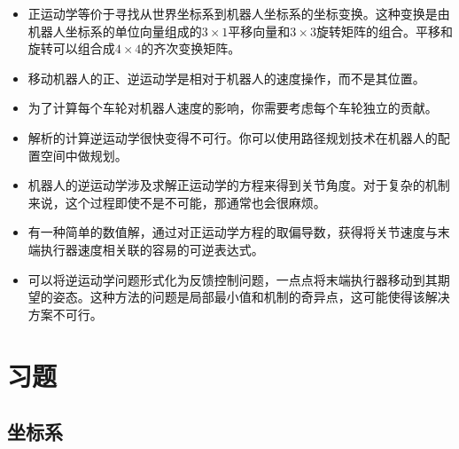 \begin{itemize}
\item 正运动学等价于寻找从世界坐标系到机器人坐标系的坐标变换。这种变换是由机器人坐标系的单位向量组成的$3\times 1$平移向量和$3\times 3$旋转矩阵的组合。平移和旋转可以组合成$4\times 4$的齐次变换矩阵。
\item 移动机器人的正、逆运动学是相对于机器人的速度操作，而不是其位置。
\item 为了计算每个车轮对机器人速度的影响，你需要考虑每个车轮独立的贡献。
\item 解析的计算逆运动学很快变得不可行。你可以使用路径规划技术在机器人的配置空间中做规划。
\item 机器人的逆运动学涉及求解正运动学的方程来得到关节角度。对于复杂的机制来说，这个过程即使不是不可能，那通常也会很麻烦。
\item 有一种简单的数值解，通过对正运动学方程的取偏导数，获得将关节速度与末端执行器速度相关联的容易的可逆表达式。
\item 可以将逆运动学问题形式化为反馈控制问题，一点点将末端执行器移动到其期望的姿态。这种方法的问题是局部最小值和机制的奇异点，这可能使得该解决方案不可行。
\end{itemize}

\section*{习题}\small
\subsection*{坐标系}

